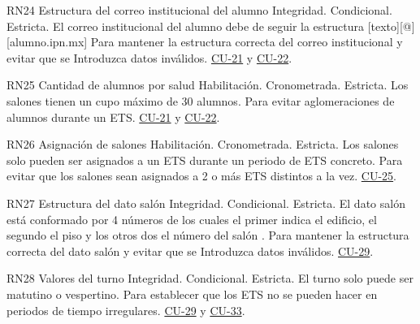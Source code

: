 \begin{BussinesRule}{RN24} {Estructura del correo institucional del alumno}
    \BRitem[Tipo:]Integridad.
    \BRitem[Clase:]Condicional.
    \BRitem[Nivel:] Estricta.
    \BRitem[Descripción:] El correo institucional del alumno debe de seguir la estructura [texto][@][alumno.ipn.mx]
    \BRitem[Motivación:] Para mantener la estructura correcta del correo institucional y evitar que se Introduzca datos inválidos.
     \hyperlink{CU-21}{CU-21} y \hyperlink{CU-22}{CU-22}.
    \end{BussinesRule}

\begin{BussinesRule}{RN25} {Cantidad de alumnos por salud}
    \BRitem[Tipo:] Habilitación.
    \BRitem[Clase:] Cronometrada.
    \BRitem[Nivel:] Estricta.
    \BRitem[Descripción:] Los salones tienen un cupo máximo de 30 alumnos.
    \BRitem[Motivación:] Para evitar aglomeraciones de alumnos durante un ETS.
     \hyperlink{CU-21}{CU-21} y \hyperlink{CU-22}{CU-22}.
    \end{BussinesRule}

\begin{BussinesRule}{RN26} {Asignación de salones}
    \BRitem[Tipo:] Habilitación.
    \BRitem[Clase:] Cronometrada.
    \BRitem[Nivel:] Estricta.
    \BRitem[Descripción:] Los salones solo pueden ser asignados a un ETS durante un periodo de ETS concreto.
    \BRitem[Motivación:] Para evitar que los salones sean asignados a 2 o más ETS distintos a la vez.
     \hyperlink{CU-25}{CU-25}.
    \end{BussinesRule}

\begin{BussinesRule}{RN27} {Estructura del dato salón}
    \BRitem[Tipo:] Integridad.
    \BRitem[Clase:]Condicional.
    \BRitem[Nivel:] Estricta.
    \BRitem[Descripción:] El dato salón está conformado por 4 números de los cuales el primer indica el edificio, el segundo el piso y los otros dos el número del salón .
    \BRitem[Motivación:] Para mantener la estructura correcta del dato salón y evitar que se Introduzca datos inválidos.
     \hyperlink{CU-29}{CU-29}.
    \end{BussinesRule}

\begin{BussinesRule}{RN28} {Valores del turno }
    \BRitem[Tipo:]Integridad.
    \BRitem[Clase:]Condicional.
    \BRitem[Nivel:] Estricta.
    \BRitem[Descripción:] El turno solo puede ser matutino o vespertino.
    \BRitem[Motivación:] Para establecer que los ETS no se pueden hacer en periodos de tiempo irregulares.
     \hyperlink{CU-29}{CU-29} y \hyperlink{CU-33}{CU-33}.
    \end{BussinesRule}

